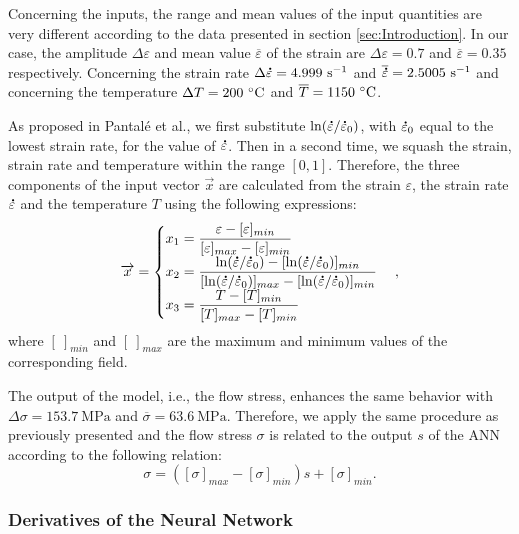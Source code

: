 \documentclass[algorithms,article,submit,pdftex,moreauthors]{Definitions/mdpi}
\makeatletter
\DeclareRobustCommand{\mdot}[1]{\accentset{\mbox{\bfseries .}}{#1}}
\DeclareRobustCommand{\ie}{i.e.,\@\xspace}
\DeclareRobustCommand{\eal}{et al.\@\xspace}
\DeclareRobustCommand{\ps}{\text{s}^{-1}}
\DeclareRobustCommand{\MPa}{\text{MPa}}
\makeatother
\begin{document}
Concerning the inputs, the range and mean values of the input quantities are very different according to the data presented in section \ref{sec:Introduction}.
In our case, the amplitude $\Delta\varepsilon$ and mean value $\overline\varepsilon$ of the strain are $\Delta\varepsilon=0.7$ and $\overline\varepsilon=0.35$ respectively.
Concerning the strain rate $\Delta\mdot{\varepsilon}=4.999~\ps$ and $\overline{\mdot{\varepsilon}}=2.5005~\ps$ and concerning the temperature $\Delta T=200~\celsius$ and $\overline T=1150~\celsius$.

As proposed in Pantalé \eal \cite{Pantale-2021-EIN}, we first substitute  $\ln(\mdot{\varepsilon}/\mdot{\varepsilon}_0)$, with $\mdot{\varepsilon}_0$ equal to the lowest strain rate, for the value of $\mdot{\varepsilon}$.
Then in a second time, we squash the strain, strain rate and temperature within the range $[0,1]$.
Therefore, the three components of the input vector $\overrightarrow{x}$ are calculated from the strain $\varepsilon$, the strain rate $\mdot{\varepsilon}$ and the temperature $T$ using the following expressions:
\begin{equation}
\overrightarrow{x}=
\begin{cases}
x_1 = \dfrac{\varepsilon - [\varepsilon]_{min}}{[\varepsilon]_{max} - [\varepsilon]_{min}}\\
x_2 = \dfrac{\ln(\mdot{\varepsilon}/\mdot{\varepsilon}_0)-[\ln(\mdot{\varepsilon}/\mdot{\varepsilon}_0)]_{min}}{[\ln(\mdot{\varepsilon}/\mdot{\varepsilon}_0)]_{max}-[\ln(\mdot{\varepsilon}/\mdot{\varepsilon}_0)]_{min}}\\
x_3 = \dfrac{T-[T]_{min}}{[T]_{max}-[T]_{min}}
\end{cases},
\label{eq:ANN-input}
\end{equation}
where $[~]_{min}$ and $[~]_{max}$  are the maximum and minimum values of the corresponding field.

The output of the model, \ie the flow stress, enhances the same behavior with $\Delta\sigma=153.7~\MPa$ and $\overline\sigma=63.6~\MPa$. Therefore, we apply the same procedure as previously presented and the flow stress $\sigma$ is related to the output $s$ of the ANN according to the following relation:
\begin{equation}
\sigma =  \left([\sigma]_{max}-[\sigma]_{min}\right)s + [\sigma]_{min}.\label{eq:ANN-output}
\end{equation}

\subsubsection{Derivatives of the Neural Network\label{subsubsec:ANN-der}}
\end{document}
